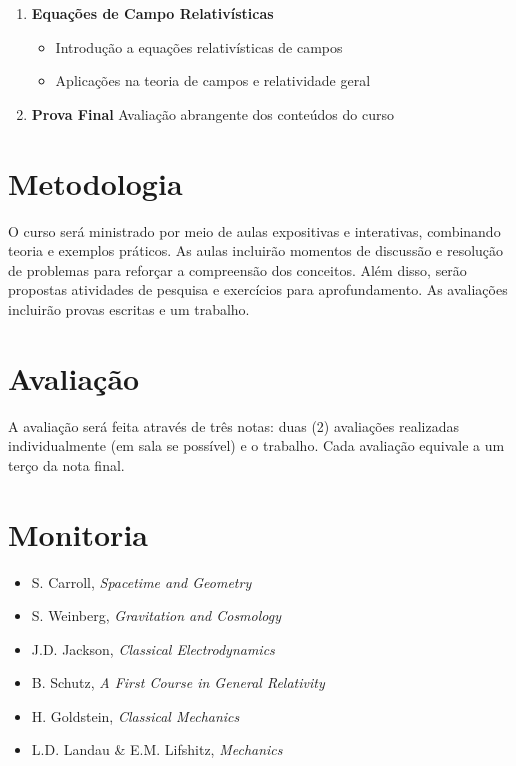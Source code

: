 \documentclass[a4paper,12pt]{article}
\begin{document}
\begin{enumerate}
\begin{itemize}
		      \item Radiação e reação radiativa
	      \end{itemize}
	\item \textbf{Equações de Campo Relativísticas}
	      \begin{itemize}
		      \item Introdução a equações relativísticas de campos
		      \item Aplicações na teoria de campos e relatividade geral
	      \end{itemize}
	\item \textbf{Prova Final} Avaliação abrangente dos conteúdos do curso
\end{enumerate}

\section{Metodologia}

O curso será ministrado por meio de aulas expositivas e interativas, combinando teoria e
exemplos práticos. As aulas incluirão momentos de discussão e resolução de problemas
para reforçar a compreensão dos conceitos. Além disso, serão propostas atividades de
pesquisa e exercícios para aprofundamento. As avaliações incluirão provas escritas e um
trabalho.

\section{Avaliação}

A avaliação será feita através de três notas: duas (2) avaliações realizadas
individualmente (em sala se possível) e o trabalho. Cada avaliação equivale a um terço
da nota final.

\section{Monitoria}

\begin{itemize}
	\item S. Carroll, \textit{Spacetime and Geometry}
	\item S. Weinberg, \textit{Gravitation and Cosmology}
	\item J.D. Jackson, \textit{Classical Electrodynamics}
	\item B. Schutz, \textit{A First Course in General Relativity}
	\item H. Goldstein, \textit{Classical Mechanics}
	\item L.D. Landau \& E.M. Lifshitz, \textit{Mechanics}
\end{itemize}
\end{document}
